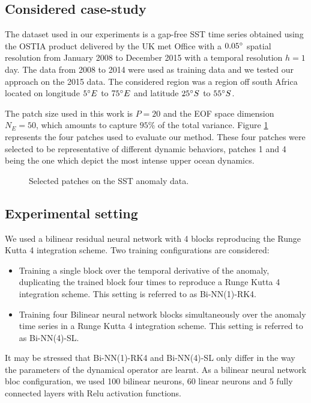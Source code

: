 \documentclass{article}
\def\remRF#1{{\noindent\color{cyan}{{\footnotesize [RF: #1]}}}}
\begin{document}
\subsection{Considered case-study}

The dataset used in our experiments is a gap-free SST time series obtained using the OSTIA product \cite{donlon_operational_2012} delivered by the UK met Office with a $0.05\degree$ spatial resolution from January 2008 to December 2015 with a temporal resolution $h=1$ day. The data from 2008 to 2014 were used as training data and we tested our approach on the 2015 data. The considered region was a region off south Africa located on longitude $5\degree E$ to $75\degree E$ and latitude $25\degree S$ to $55\degree S$.

The patch size used in this work is $P=20$ and the EOF space dimension $N_E=50$, which amounts to capture $95\%$ of the total variance. Figure \ref{fig:dsstp} represents the four patches used to evaluate our method. These four patches were selected to be representative of different dynamic behaviors, patches 1 and 4 being the one which depict the most intense upper ocean dynamics.

\begin{figure}[htb]

\begin{minipage}[b]{1.0\linewidth}
  \centering
\centerline{}
\caption{Selected patches on the SST anomaly data.}
\label{fig:dsstp}
\end{minipage}
\end{figure}


\subsection{Experimental setting}
We used a bilinear residual neural network with 4 blocks reproducing the Runge Kutta 4 integration scheme. Two training configurations are considered:
\begin{itemize}[topsep=0pt]
\itemsep0em 
\item Training a single block over the temporal derivative of the anomaly, duplicating the trained block four times to reproduce a Runge Kutta 4 integration scheme. This setting is referred to as Bi-NN(1)-RK4.
\item Training four Bilinear neural network blocks simultaneously over the anomaly time series in a Runge Kutta 4 integration scheme. This setting is referred to as Bi-NN(4)-SL. 
\end{itemize}
It may be stressed that Bi-NN(1)-RK4 and Bi-NN(4)-SL only differ in the way the parameters of the dynamical operator are learnt.
As a bilinear neural network bloc configuration, we used 100 bilinear neurons, 60 linear neurons and 5 fully connected layers with Relu activation functions. 
\end{document}
